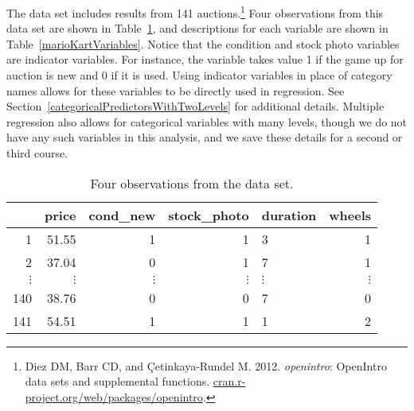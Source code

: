The data set  includes results from 141 auctions.\footnote{Diez DM, Barr CD, and \c{C}etinkaya-Rundel M. 2012. \emph{openintro}: OpenIntro data sets and supplemental functions. \href{http://cran.r-project.org/web/packages/openintro}{cran.r-project.org/web/packages/openintro}.} Four observations from this data set are shown in Table~\ref{marioKartDataMatrix}, and descriptions for each variable are shown in Table~\ref{marioKartVariables}. Notice that the condition and stock photo variables are indicator variables. For instance, the  variable takes value 1 if the game up for auction is new and 0 if it is used. Using indicator variables in place of category names allows for these variables to be directly used in regression. See Section~\ref{categoricalPredictorsWithTwoLevels} for additional details. Multiple regression also allows for categorical variables with many levels, though we do not have any such variables in this analysis, and we save these details for a second or third course.

\begin{table}[ht]
\centering
\begin{tabular}{rrrrlr}
  \hline
 & price & cond\_\hspace{0.3mm}new & stock\_\hspace{0.3mm}photo & duration & wheels \\ 
  \hline
1 & 51.55 &   1 & 1 & 3 &   1 \\ 
  2 & 37.04 &  0 &  1 & 7 &   1 \\ 
$\vdots$ &$\vdots$ &$\vdots$ &$\vdots$ &$\vdots$ &$\vdots$ \\
  140 & 38.76 &  0 &  0 & 7 &   0 \\ 
  141 & 54.51 &  1 &  1 & 1 &   2 \\ 
   \hline
\end{tabular}
\caption{Four observations from the  data set.}
\label{marioKartDataMatrix}
\end{table}


